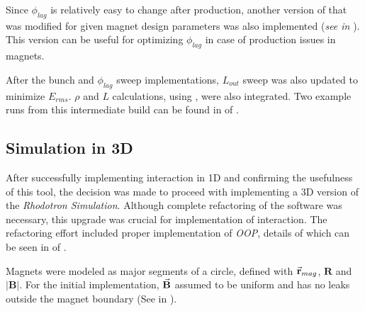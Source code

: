 \documentclass[a4paper,oneside,12pt]{report}
\numberwithin{equation}{chapter}
\begin{document}
Since $\phi_{lag}$ is relatively easy to change after production, another version of  that was modified for given magnet design parameters was also implemented (\textit{see  in }). 
This version can be useful for optimizing $\phi_{lag}$ in case of production issues in magnets. 

After the bunch and $\phi_{lag}$ sweep implementations, $L_{out}$ sweep was also updated to minimize $E_{rms}$. $\rho$ and $L$ calculations, using , were also integrated. 
Two example runs from this intermediate build can be found in  of .

\subsection{Simulation in 3D}
After successfully implementing \eE interaction in 1D and confirming the usefulness of this tool, the decision was made to proceed with implementing a 3D version of the \textit{Rhodotron Simulation}.
Although complete refactoring of the software was necessary, this upgrade was crucial for implementation of \eB interaction.
The refactoring effort included proper implementation of \textit{OOP}, details of which can be seen in  of .

Magnets were modeled as major segments of a circle, defined with $\vec{\textbf{r}}_{mag}$, $\textbf{R}$ and $|\textbf{B}|$. 
For the initial implementation, $\vec{\textbf{B}}$ assumed to be uniform and has no leaks outside the magnet boundary (See  in ).
\end{document}
